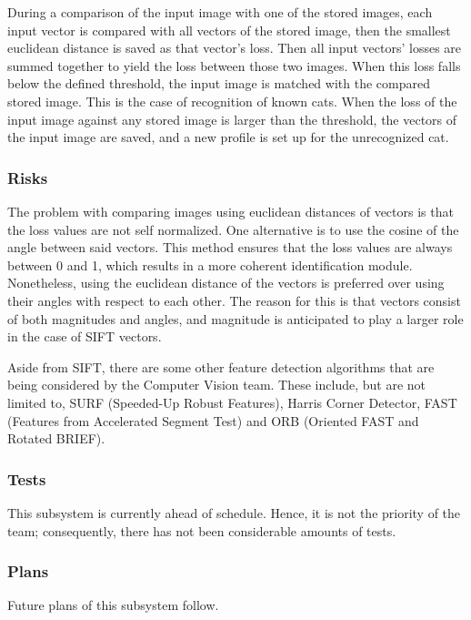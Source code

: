 During a comparison of the input image with one of the stored images, each input vector is compared with all vectors of the stored image, then the smallest euclidean distance is saved as that vector's loss. Then all input vectors' losses are summed together to yield the loss between those two images. When this loss falls below the defined threshold, the input image is matched with the compared stored image. This is the case of recognition of known cats. When the loss of the input image against any stored image is larger than the threshold, the vectors of the input image are saved, and a new profile is set up for the unrecognized cat.

\subsubsection{Risks}

The problem with comparing images using euclidean distances of vectors is that the loss values are not self normalized. One alternative is to use the cosine of the angle between said vectors. This method ensures that the loss values are always between 0 and 1, which results in a more coherent identification module. Nonetheless, using the euclidean distance of the vectors is preferred over using their angles with respect to each other. The reason for this is that vectors consist of both magnitudes and angles, and magnitude is anticipated to play a larger role in the case of SIFT vectors.

Aside from SIFT, there are some other feature detection algorithms that are being considered by the Computer Vision team. These include, but are not limited to, SURF (Speeded-Up Robust Features), Harris Corner Detector, FAST (Features from Accelerated Segment Test) and ORB (Oriented FAST and Rotated BRIEF).

\subsubsection{Tests}

This subsystem is currently ahead of schedule. Hence, it is not the priority of the team; consequently, there has not been considerable amounts of tests.

\subsubsection{Plans}

Future plans of this subsystem follow.

